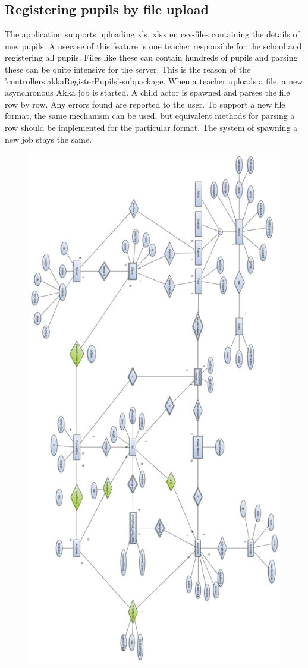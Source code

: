 \documentclass[11pt,a4paper]{article}
\begin{document}
\subsection{Registering pupils by file upload}
The application supports uploading xls, xlsx en csv-files containing the details of new pupils.
A usecase of this feature is one teacher responsible for the school and registering all pupils. Files like these can contain hundreds of pupils and parsing these can be quite intensive for the server. This is the reason of the 'controllers.akkaRegisterPupils'-subpackage. When a teacher uploads a file, a new asynchronous Akka job is started. A child actor is spawned and parses the file row by row. Any errors found are reported to the user. To support a new file format, the same mechanism can be used, but equivalent methods for parsing a row should be implemented for the particular format. The system of spawning a new job stays the same.



\begin{figure}[h!]
\centering
\includegraphics[scale=0.4]{eer.jpg}
\end{figure}
\end{document}

